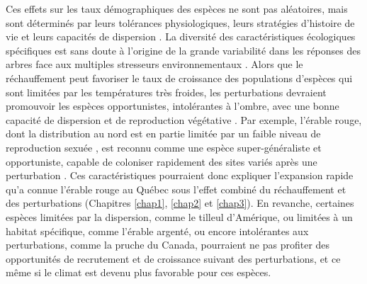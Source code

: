 Ces effets sur les taux démographiques des espèces ne sont pas
aléatoires, mais sont déterminés par leurs tolérances physiologiques,
leurs stratégies d'histoire de vie et leurs capacités de dispersion
\citep{aubin_traits_2016, estrada_species_2015}. La diversité des
caractéristiques écologiques spécifiques est sans doute à l'origine de
la grande variabilité dans les réponses des arbres face aux multiples
stresseurs environnementaux \citep{serra-diaz_disturbance_2015}. Alors
que le réchauffement peut favoriser le taux de croissance des
populations d'espèces qui sont limitées par les températures très
froides, les perturbations devraient promouvoir les espèces
opportunistes, intolérantes à l'ombre, avec une bonne capacité de
dispersion et de reproduction végétative \citep[Chapitre
\ref{chap3};][]{danneyrolles_stronger_2019, de_frenne_microclimate_2013}.
Par exemple, l'érable rouge, dont la distribution au nord est en partie
limitée par un faible niveau de reproduction sexuée
\citep{tremblay_potential_2002}, est reconnu comme une espèce
super-généraliste et opportuniste, capable de coloniser rapidement des
sites variés après une perturbation
\citep{abrams_red_1998, fei_rapid_2009}. Ces caractéristiques pourraient
donc expliquer l'expansion rapide qu'a connue l'érable rouge au Québec
sous l'effet combiné du réchauffement et des perturbations (Chapitres
\ref{chap1}, \ref{chap2} et \ref{chap3}). En revanche, certaines espèces
limitées par la dispersion, comme le tilleul d'Amérique, ou limitées à
un habitat spécifique, comme l'érable argenté, ou encore intolérantes
aux perturbations, comme la pruche du Canada, pourraient ne pas profiter
des opportunités de recrutement et de croissance suivant des
perturbations, et ce même si le climat est devenu plus favorable pour
ces espèces.

